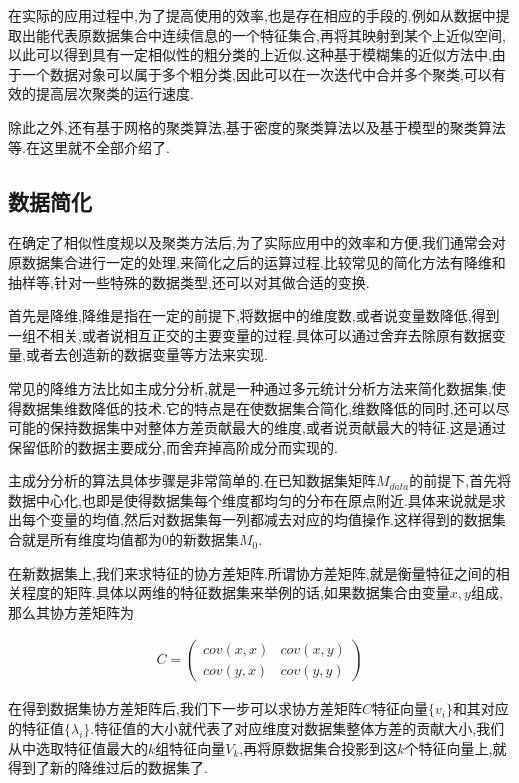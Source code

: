 在实际的应用过程中,为了提高使用的效率,也是存在相应的手段的.例如从数据中提取出能代表原数据集合中连续信息的一个特征集合,再将其映射到某个上近似空间,以此可以得到具有一定相似性的粗分类的上近似\cite{kumar2007rough}.这种基于模糊集的近似方法中,由于一个数据对象可以属于多个粗分类,因此可以在一次迭代中合并多个聚类,可以有效的提高层次聚类的运行速度.

除此之外,还有基于网格的聚类算法,基于密度的聚类算法以及基于模型的聚类算法等.在这里就不全部介绍了.

\subsection{数据简化}

在确定了相似性度规以及聚类方法后,为了实际应用中的效率和方便,我们通常会对原数据集合进行一定的处理,来简化之后的运算过程.比较常见的简化方法有降维和抽样等,针对一些特殊的数据类型,还可以对其做合适的变换.

首先是降维,降维是指在一定的前提下,将数据中的维度数,或者说变量数降低,得到一组不相关,或者说相互正交的主要变量的过程.具体可以通过舍弃去除原有数据变量,或者去创造新的数据变量等方法来实现.

常见的降维方法比如主成分分析,就是一种通过多元统计分析方法来简化数据集,使得数据集维数降低的技术.它的特点是在使数据集合简化,维数降低的同时,还可以尽可能的保持数据集中对整体方差贡献最大的维度,或者说贡献最大的特征.这是通过保留低阶的数据主要成分,而舍弃掉高阶成分而实现的.

主成分分析的算法具体步骤是非常简单的.在已知数据集矩阵$M_{data}$的前提下,首先将数据中心化,也即是使得数据集每个维度都均匀的分布在原点附近.具体来说就是求出每个变量的均值,然后对数据集每一列都减去对应的均值操作.这样得到的数据集合就是所有维度均值都为0的新数据集$M_0$.

在新数据集上,我们来求特征的协方差矩阵.所谓协方差矩阵,就是衡量特征之间的相关程度的矩阵.具体以两维的特征数据集来举例的话,如果数据集合由变量$x,y$组成,那么其协方差矩阵为

\begin{eqnarray}
	C = \left(
			\begin{array}{cc}
				cov(x,x) & cov(x,y)\\
				cov(y,x) & cov(y,y)
			\end{array}
		\right)
\end{eqnarray}

在得到数据集协方差矩阵后,我们下一步可以求协方差矩阵$C$特征向量$\{v_i\}$和其对应的特征值$\{\lambda_i\}$.特征值的大小就代表了对应维度对数据集整体方差的贡献大小,我们从中选取特征值最大的$k$组特征向量$V_k$,再将原数据集合投影到这$k$个特征向量上,就得到了新的降维过后的数据集了.

